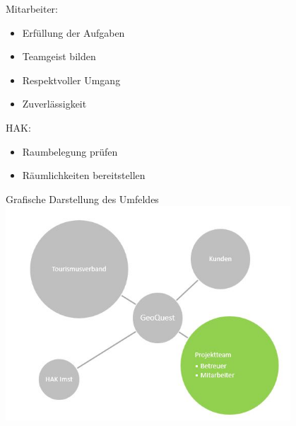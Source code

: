 \begin{itemize}
	Mitarbeiter:
	\begin{itemize}
		\item Erfüllung der Aufgaben
		\item Teamgeist bilden
		\item Respektvoller Umgang
		\item Zuverlässigkeit\\
	\end{itemize}
	
	HAK:
	\begin{itemize}
		\item Raumbelegung prüfen
		\item Räumlichkeiten bereitstellen\\
	\end{itemize}
	
	Grafische Darstellung des Umfeldes\\
	\includegraphics[height=8cm]{StakeholderGrafisch}
	
\end{itemize}
